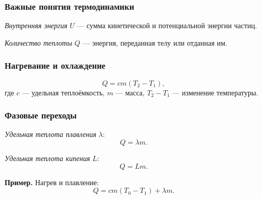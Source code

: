 \documentclass[12pt, a4paper]{article}
\begin{document}
\subsubsection*{Важные понятия термодинамики}
\textit{Внутренняя энергия} $U$ — сумма кинетической и потенциальной энергии частиц.

\textit{Количество теплоты} $Q$ — энергия, переданная телу или отданная им.

\subsubsection*{Нагревание и охлаждение}
\[
Q = cm(T_2 - T_1),
\]
где $c$ — удельная теплоёмкость, $m$ — масса, $T_2 - T_1$ — изменение температуры.

\subsubsection*{Фазовые переходы}
\textit{Удельная теплота плавления} $\lambda$:
\[
Q = \lambda m.
\]

\textit{Удельная теплота кипения} $L$:
\[
Q = L m.
\]

\textbf{Пример.} Нагрев и плавление:
\[
Q = cm(T_0 - T_1) + \lambda m.
\]
\end{document}
